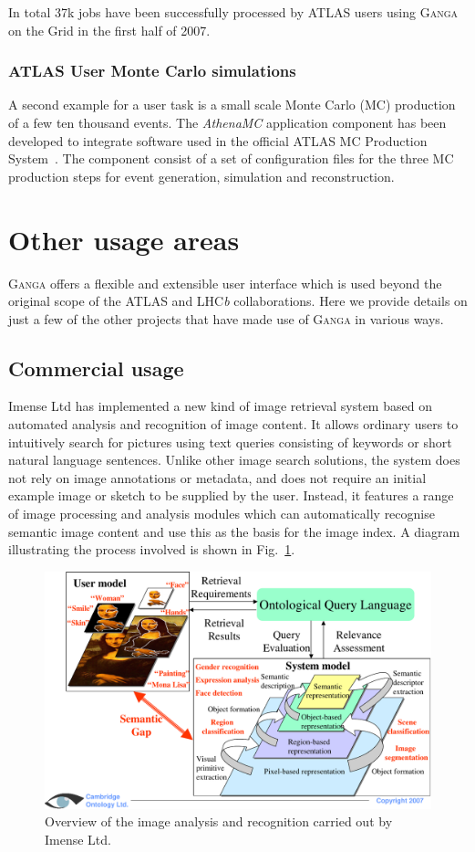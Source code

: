 \documentclass{elsart}
\def\lhcb {LHC{\em b\/}\xspace}
\def\atlas {ATLAS\xspace}
\def\ganga {\textsc{Ganga}\xspace}
\def\grid {Grid\xspace}
\begin{document}
In total 37k jobs have been successfully processed by \atlas users using
\ganga on the \grid in the first half of 2007.

\subsubsection{\atlas User Monte Carlo simulations}
A second example for a user task is a small scale Monte Carlo (MC) production
of a few ten thousand events. The \emph{AthenaMC} application component has
been developed to integrate software used in the official \atlas MC Production
System~\cite{bib:atlasprodsys}.  The component consist of a set of
configuration files for the three MC production steps for event generation,
simulation and reconstruction.

\section{Other usage areas}
\label{sec:other}
\ganga offers a flexible and extensible user interface which is used beyond
the original scope of the \atlas and \lhcb collaborations. Here we provide
details on just a few of the other projects that have made use of \ganga in
various ways.

\subsection{Commercial usage}
\label{sec:Imense}
Imense Ltd has implemented a new kind of image retrieval system based on
automated analysis and recognition of image content. It allows ordinary users
to intuitively search for pictures using text queries consisting of keywords
or short natural language sentences. Unlike other image search solutions, the
system does not rely on image annotations or metadata, and does not require an
initial example image or sketch to be supplied by the user. Instead, it
features a range of image processing and analysis modules which can
automatically recognise semantic image content and use this as the basis for
the image index. A diagram illustrating the process involved is shown in
Fig.~\ref{fig:camtologytech}.
\begin{figure}[htb]
  \begin{center}
    \includegraphics[width=0.85 \textwidth]{camtologyfigure.pdf}
  \end{center}
  \caption{Overview of the image analysis and recognition carried
    out by Imense Ltd.}
  \label{fig:camtologytech}
\end{figure}
\end{document}
